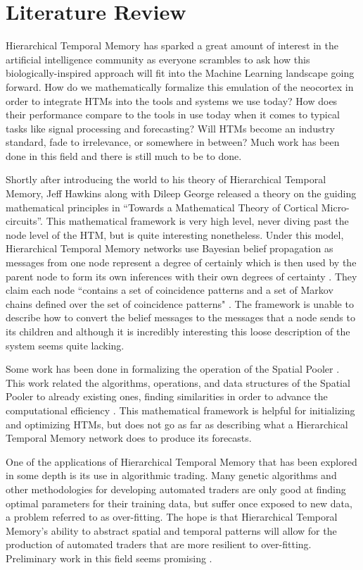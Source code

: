\documentclass[fleqn,minimal]{article}
\newcommand\blankpage{
	\pagebreak
	\ifthispageodd{\null
		\vfill
		\vfill
		\thispagestyle{empty}
		\clearpage}{}
}
\begin{document}
	
	\blankpage
	\section{Literature Review}
	
	Hierarchical Temporal Memory has sparked a great amount of interest in the artificial intelligence community as everyone scrambles to ask how this biologically-inspired approach will fit into the Machine Learning landscape going forward. How do we mathematically formalize this emulation of the neocortex in order to integrate HTMs into the tools and systems we use today? How does their performance compare to the tools in use today when it comes to typical tasks like signal processing and forecasting? Will HTMs become an industry standard, fade to irrelevance, or somewhere in between? Much work has been done in this field and there is still much to be to done.
	
	Shortly after introducing the world to his theory of Hierarchical Temporal Memory, Jeff Hawkins along with Dileep George released a theory on the guiding mathematical principles in ``Towards a Mathematical Theory of Cortical Micro-circuits''. This mathematical framework is very high level, never diving past the node level of the HTM, but is quite interesting nonetheless. Under this model, Hierarchical Temporal Memory networks use Bayesian belief propagation as messages from one node represent a degree of certainly which is then used by the parent node to form its own inferences with their own degrees of certainty \cite{Towards}. They claim each node ``contains a set of coincidence patterns and a set of Markov chains defined over the set of coincidence patterns" \cite{Towards}. The framework is unable to describe how to convert the belief messages to the messages that a node sends to its children and although it is incredibly interesting this loose description of the system seems quite lacking.
	
	Some work has been done in formalizing the operation of the Spatial Pooler \cite{Framework}. This work related the algorithms, operations, and data structures of the Spatial Pooler to already existing ones, finding similarities in order to advance the computational efficiency \cite{Framework}. This mathematical framework is helpful for initializing and optimizing HTMs, but does not go as far as describing what a Hierarchical Temporal Memory network does to produce its forecasts.
	
	One of the applications of Hierarchical Temporal Memory that has been explored in some depth is its use in algorithmic trading. Many genetic algorithms and other methodologies for developing automated traders are only good at finding optimal parameters for their training data, but suffer once exposed to new data, a problem referred to as over-fitting. The hope is that Hierarchical Temporal Memory's ability to abstract spatial and temporal patterns will allow for the production of automated traders that are more resilient to over-fitting. Preliminary work in this field seems promising \cite{Evaluation}.
	
\end{document}
